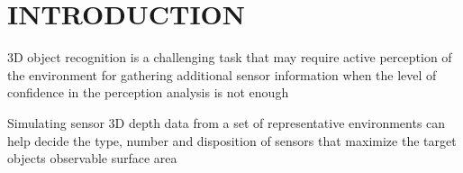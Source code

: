 \section{\uppercase{Introduction}}\label{sec:introduction}

\noindent 3D object recognition is a challenging task that may require active perception of the environment for gathering additional sensor information when the level of confidence in the perception analysis is not enough

Simulating sensor 3D depth data from a set of representative environments can help decide the type, number and disposition of sensors that maximize the target objects observable surface area
